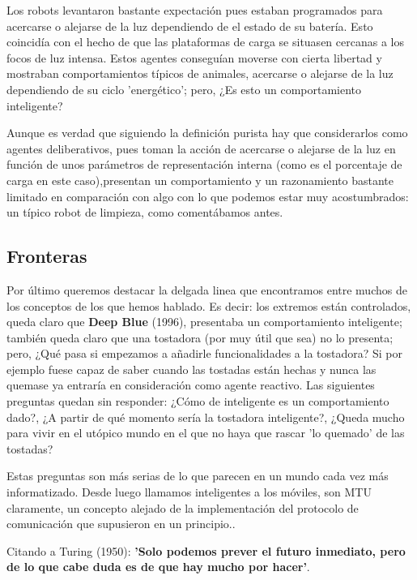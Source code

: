 \vspace{10px}

Los robots levantaron bastante expectación pues estaban programados para acercarse o alejarse de la luz dependiendo de el estado de su batería. Esto coincidía con el hecho de que las plataformas de carga se situasen cercanas a los focos de luz intensa. Estos agentes conseguían moverse con cierta libertad y mostraban comportamientos típicos de animales, acercarse o alejarse de la luz dependiendo de su ciclo 'energético'; pero, ¿Es esto un comportamiento inteligente?

\vspace{10px}

Aunque es verdad que siguiendo la definición purista hay que considerarlos como agentes deliberativos, pues toman la acción de acercarse o alejarse de la luz en función de unos parámetros de representación interna (como es el porcentaje de carga en este caso),presentan un comportamiento y un razonamiento bastante limitado en comparación con algo con lo que podemos estar muy acostumbrados: un típico robot de limpieza, como comentábamos antes.

\subsection{Fronteras}

Por último queremos destacar la delgada linea que encontramos entre muchos de los conceptos de los que hemos hablado. Es decir: los extremos están controlados, queda claro que \textbf{Deep Blue} (1996), presentaba un comportamiento inteligente; también queda claro que una tostadora (por muy útil que sea) no lo presenta; pero, ¿Qué pasa si empezamos a añadirle funcionalidades a la tostadora? Si por ejemplo fuese capaz de saber cuando las tostadas están hechas y nunca las quemase ya entraría en consideración como agente reactivo. Las siguientes preguntas quedan sin responder: ¿Cómo de inteligente es un comportamiento dado?, ¿A partir de qué momento sería la tostadora inteligente?, ¿Queda mucho para vivir en el utópico mundo en el que no haya que rascar 'lo quemado' de las tostadas?

\vspace{10px}

Estas preguntas son más serias de lo que parecen en un mundo cada vez más informatizado. Desde luego llamamos inteligentes a los móviles, son MTU claramente, un concepto alejado de la implementación del protocolo de comunicación que supusieron en un principio.. 

\vspace{10px}

Citando a Turing (1950): \textbf{'Solo podemos prever el futuro inmediato, pero de lo que cabe duda es de que hay mucho por hacer'}.



\newpage
	
